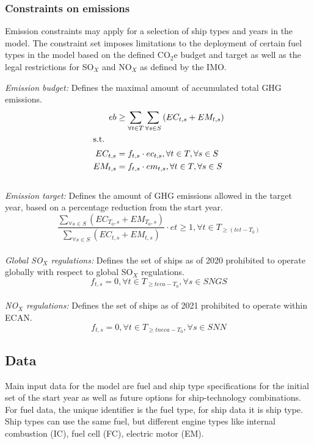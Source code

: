 \documentclass[article]{elsarticle}
\begin{document}
\subsubsection{Constraints on emissions}
\label{subsubsec:emconstraints}
Emission constraints may apply for a selection of ship types and years in the model. The constraint set imposes limitations to the deployment of certain fuel types in the model based on the defined CO$_2$e budget and target as well as the legal restrictions for SO$_X$ and NO$_X$ as defined by the IMO.
\\\par\noindent
\textit{Emission budget: }Defines the maximal amount of accumulated total GHG emissions.
\begin{subequations}
    \begin{align}
    eb &\geq \sum_{\forall t \in T}\sum_{\forall s \in S}\left(EC_{t,s} + EM_{t,s} \right) \label{eq:co2ebudget}\\
    \intertext{s.t.}
    EC_{t,s} &= f_{t,s} \cdot ec_{t,s}, \forall t \in T, \forall s \in S\\
    EM_{t,s} &= f_{t,s} \cdot em_{t,s}, \forall t \in T, \forall s \in S
    \end{align}
\end{subequations}\\
\textit{Emission target: }Defines the amount of GHG emissions allowed in the target year, based on a percentage reduction from the start year.
\begin{equation}
    \frac{\sum_{\forall s \in S} \left(EC_{T_0,s}+EM_{T_0,s}\right)}{\sum_{\forall s \in S} \left(EC_{t,s}+EM_{t,s}\right)} \cdot et \geq 1, \forall t \in T_{\geq \left(tet-T_0\right)}
\end{equation}\\
\textit{Global SO$_X$ regulations: }Defines the set of ships as of 2020 prohibited to operate globally with respect to global SO$_X$ regulations.
\begin{equation}
    f_{t,s} = 0, \forall t \in T_{\geq teca-T_0}, \forall s \in SNGS \label{eq:sox_global}
\end{equation}\\
\textit{NO$_X$ regulations: }Defines the set of ships as of 2021 prohibited to operate within ECAN.
\begin{equation}
   f_{t,s} = 0, \forall t \in T_{\geq tneca-T_0},\forall s \in SNN \label{eq:tier}
\end{equation}


\subsection{Data}
\label{subsec:Dat}
Main input data for the model are fuel and ship type specifications for the initial set of the start year as well as future options for ship-technology combinations. For fuel data, the unique identifier is the fuel type, for ship data it is ship type. Ship types can use the same fuel, but different engine types like internal combustion (IC), fuel cell (FC), electric motor (EM).
\end{document}
